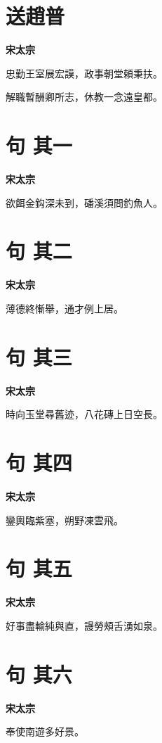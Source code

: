 \documentclass[12pt,a4paper]{ctexbook}
\begin{document}
\section{送趙普}
\textbf{宋太宗}\par\vspace{0.5em}
忠勤王室展宏謨，政事朝堂頼秉扶。\par
解職暫酬卿所志，休教一念遠皇都。\par

\section{句  其一}
\textbf{宋太宗}\par\vspace{0.5em}
欲餌金鈎深未到，磻溪須問釣魚人。\par

\section{句  其二}
\textbf{宋太宗}\par\vspace{0.5em}
薄德終慚舉，通才例上居。\par

\section{句  其三}
\textbf{宋太宗}\par\vspace{0.5em}
時向玉堂尋舊迹，八花磚上日空長。\par

\section{句  其四}
\textbf{宋太宗}\par\vspace{0.5em}
鑾輿臨紫塞，朔野凍雲飛。\par

\section{句  其五}
\textbf{宋太宗}\par\vspace{0.5em}
好事盡輸純與直，謾勞頰舌湧如泉。\par

\section{句  其六}
\textbf{宋太宗}\par\vspace{0.5em}
奉使南遊多好景。\par
\end{document}
